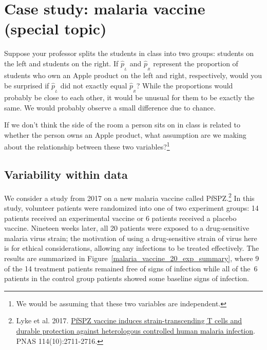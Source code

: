 

\section[Case study: malaria vaccine (special topic)]
  {Case study: malaria vaccine\\(special topic)}%

\begin{example}{Suppose your professor splits the students in class into two groups: students on the left and students on the right. If $\hat{p}_{_L}$ and $\hat{p}_{_R}$ represent the proportion of students who own an Apple product on the left and right, respectively, would you be surprised if $\hat{p}_{_L}$ did not {exactly} equal $\hat{p}_{_R}$?}\label{classRightLeftSideApple}
While the proportions would probably be close to each other, it would be unusual for them to be exactly the same. We would probably observe a small difference due to {chance}.
\end{example}

\begin{exercise}
If we don't think the side of the room a person sits on in class is related to whether the person owns an Apple product, what assumption are we making about the relationship between these two variables?\footnote{We would be assuming that these two variables are independent.}
\end{exercise}

\subsection{Variability within data}
\label{variabilityWithinData}


We consider a study from 2017 on a new malaria vaccine
called PfSPZ.\footnote{Lyke et al. 2017.
  \href{http://www.pnas.org/content/114/10/2711}
      {PfSPZ vaccine induces strain-transcending T cells
      and durable protection against heterologous controlled
      human malaria infection}.
  PNAS 114(10):2711-2716.}
In this study, volunteer patients were randomized
into one of two experiment groups:
14 patients received an experimental vaccine
or 6 patients received a placebo vaccine.
Nineteen weeks later, all 20 patients were exposed
to a drug-sensitive malaria virus strain;
the motivation of using a drug-sensitive strain
of virus here is for ethical considerations,
allowing any infections to be treated effectively.
The results are summarized in
Figure~\ref{malaria_vaccine_20_exp_summary},
where 9 of the 14 treatment patients remained free
of signs of infection while all of the~6 patients
in the control group patients showed some baseline
signs of infection.

